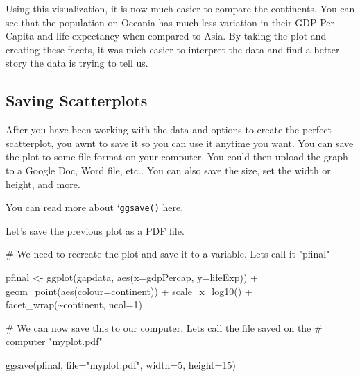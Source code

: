 \documentclass[
  letterpaper,
  DIV=11,
  numbers=noendperiod]{scrreprt}
\newenvironment{Shaded}{\begin{snugshade}}{\end{snugshade}}
\newcommand{\AttributeTok}[1]{\textcolor[rgb]{0.40,0.45,0.13}{#1}}
\newcommand{\CommentTok}[1]{\textcolor[rgb]{0.37,0.37,0.37}{#1}}
\newcommand{\DecValTok}[1]{\textcolor[rgb]{0.68,0.00,0.00}{#1}}
\newcommand{\FunctionTok}[1]{\textcolor[rgb]{0.28,0.35,0.67}{#1}}
\newcommand{\NormalTok}[1]{\textcolor[rgb]{0.00,0.23,0.31}{#1}}
\newcommand{\OtherTok}[1]{\textcolor[rgb]{0.00,0.23,0.31}{#1}}
\newcommand{\SpecialCharTok}[1]{\textcolor[rgb]{0.37,0.37,0.37}{#1}}
\newcommand{\StringTok}[1]{\textcolor[rgb]{0.13,0.47,0.30}{#1}}
\begin{document}
Using this visualization, it is now much easier to compare the
continents. You can see that the population on Oceania has much less
variation in their GDP Per Capita and life expectancy when compared to
Asia. By taking the plot and creating these facets, it was mich easier
to interpret the data and find a better story the data is trying to tell
us.

\subsection*{Saving Scatterplots}\label{saving-scatterplots}

After you have been working with the data and options to create the
perfect scatterplot, you awnt to save it so you can use it anytime you
want. You can save the plot to some file format on your computer. You
could then upload the graph to a Google Doc, Word file, etc.. You can
also save the size, set the width or height, and more.

You can read more about `\texttt{ggsave()} here.

Let's save the previous plot as a PDF file.

\begin{Shaded}
\begin{Highlighting}[]
\CommentTok{\# We need to recreate the plot and save it to a variable. Let\textquotesingle{}s call it "pfinal"}

\NormalTok{pfinal }\OtherTok{\textless{}{-}} \FunctionTok{ggplot}\NormalTok{(gapdata, }\FunctionTok{aes}\NormalTok{(}\AttributeTok{x=}\NormalTok{gdpPercap, }\AttributeTok{y=}\NormalTok{lifeExp)) }\SpecialCharTok{+}
          \FunctionTok{geom\_point}\NormalTok{(}\FunctionTok{aes}\NormalTok{(}\AttributeTok{colour=}\NormalTok{continent)) }\SpecialCharTok{+}
          \FunctionTok{scale\_x\_log10}\NormalTok{() }\SpecialCharTok{+}
          \FunctionTok{facet\_wrap}\NormalTok{(}\SpecialCharTok{\textasciitilde{}}\NormalTok{continent, }\AttributeTok{ncol=}\DecValTok{1}\NormalTok{) }

\CommentTok{\# We can now save this to our computer. Let\textquotesingle{}s call the file saved on the }
\CommentTok{\# computer "myplot.pdf"}

\FunctionTok{ggsave}\NormalTok{(pfinal, }\AttributeTok{file=}\StringTok{"myplot.pdf"}\NormalTok{, }\AttributeTok{width=}\DecValTok{5}\NormalTok{, }\AttributeTok{height=}\DecValTok{15}\NormalTok{)}
\end{Highlighting}
\end{Shaded}
\end{document}
